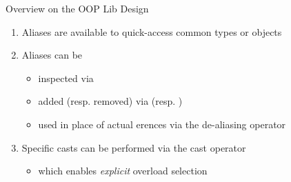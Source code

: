 \documentclass[handout]{beamer}
\begin{document}
\begin{frame}[allowframebreaks]{Overview on the OOP Lib Design}
\begin{enumerate}
        \framebreak

        \item \alert{Aliases} are available to quick-access common types or objects

        \framebreak

        \item \alert{Aliases} can be
        \begin{itemize}
            \item inspected via 
            \item added (resp. removed) via  (resp. )
            \item used in place of actual erences via the \alert{de-aliasing operator} 
        \end{itemize}

        \framebreak

        \item \alert{Specific casts} can be performed via the \alert{cast operator} 
        \begin{itemize}
            \item which enables \emph{explicit} overload selection
        \end{itemize}
    \end{enumerate}

    \framebreak


\end{frame}
\end{document}
